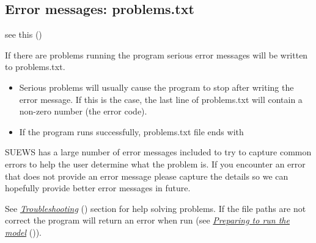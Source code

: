 \documentclass[letterpaper,10pt,english]{sphinxmanual}
\begin{document}
\subsection{Error messages: problems.txt}
\label{\detokenize{output-files:error-messages-problems-txt}}
see this {\hyperref[\detokenize{output-files:output-files}]{}} ()

If there are problems running the program serious error messages will be
written to problems.txt.
\begin{itemize}
\item {} 
Serious problems will usually cause the program to stop after writing
the error message. If this is the case, the last line of problems.txt
will contain a non-zero number (the error code).

\item {} 
If the program runs successfully, problems.txt file ends with

\end{itemize}

\begin{DUlineblock}{0em}
\item[] 
\item[] 
\end{DUlineblock}

SUEWS has a large number of error messages included to try to capture
common errors to help the user determine what the problem is. If you
encounter an error that does not provide an error message please capture
the details so we can hopefully provide better error messages in future.

See {\hyperref[\detokenize{output-files:Troubleshooting}]{\emph{Troubleshooting}}} () section for help solving
problems. If the file paths are not correct the program will return an
error when run (see {\hyperref[\detokenize{output-files:Preparing_to_run_the_model}]{\emph{Preparing to run the
model}}} ()).
\end{document}
